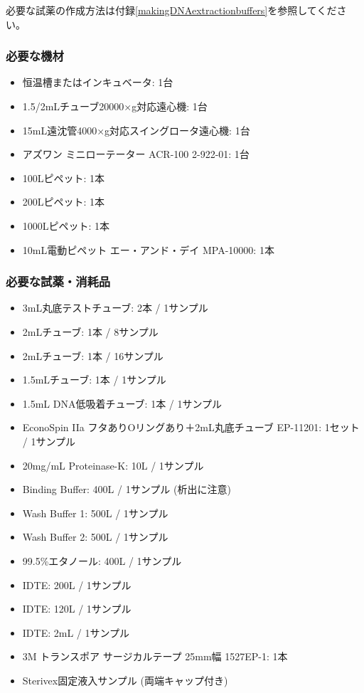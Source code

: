 \documentclass[titlepage,10pt,a4paper]{jsbook}
\begin{document}
必要な試薬の作成方法は付録\ref{makingDNAextractionbuffers}を参照してください。

\subsubsection{必要な機材}
\begin{itemize}
\item 恒温槽またはインキュベータ: 1台
\item 1.5/2mLチューブ20000×g対応遠心機: 1台
\item 15mL遠沈管4000×g対応スイングロータ遠心機: 1台
\item アズワン ミニローテーター ACR-100 2-922-01: 1台
\item 100{\textmu}Lピペット: 1本
\item 200{\textmu}Lピペット: 1本
\item 1000{\textmu}Lピペット: 1本
\item 10mL電動ピペット エー・アンド・デイ MPA-10000: 1本
\end{itemize}

\subsubsection{必要な試薬・消耗品}
\begin{itemize}
\item 3mL丸底テストチューブ: 2本 / 1サンプル
\item 2mLチューブ: 1本 / 8サンプル
\item 2mLチューブ: 1本 / 16サンプル
\item 1.5mLチューブ: 1本 / 1サンプル
\item 1.5mL DNA低吸着チューブ: 1本 / 1サンプル
\item EconoSpin IIa フタありOリングあり＋2mL丸底チューブ EP-11201: 1セット / 1サンプル
\item 20mg/mL Proteinase-K: 10{\textmu}L / 1サンプル
\item Binding Buffer: 400{\textmu}L / 1サンプル (析出に注意)
\item Wash Buffer 1: 500{\textmu}L / 1サンプル
\item Wash Buffer 2: 500{\textmu}L / 1サンプル
\item 99.5\%エタノール: 400{\textmu}L / 1サンプル
\item IDTE: 200{\textmu}L / 1サンプル
\item IDTE: 120{\textmu}L / 1サンプル
\item IDTE: 2mL / 1サンプル
\item 3M トランスポア サージカルテープ 25mm幅 1527EP-1: 1本
\item Sterivex固定液入サンプル (両端キャップ付き)
\end{itemize}
\end{document}
